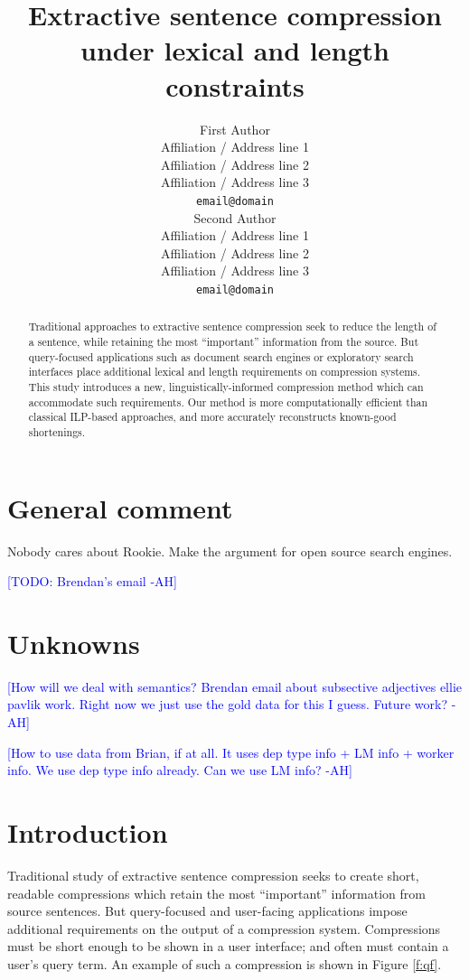 \documentclass[11pt,a4paper]{article}
\title{Extractive sentence compression under lexical and length constraints}
\author{First Author \\
  Affiliation / Address line 1 \\
  Affiliation / Address line 2 \\
  Affiliation / Address line 3 \\
  {\tt email@domain} \\\And
  Second Author \\
  Affiliation / Address line 1 \\
  Affiliation / Address line 2 \\
  Affiliation / Address line 3 \\
  {\tt email@domain} \\}
\date{}
\newcommand{\ahcomment}[1]{\textcolor{blue}{[#1 -AH]}}
\begin{document}
\maketitle

\begin{abstract}
Traditional approaches to extractive sentence compression seek to reduce the length of a sentence, while retaining the most ``important'' information from the source. But query-focused applications such as document search engines or exploratory search interfaces place additional lexical and length requirements on compression systems. This study introduces a new, linguistically-informed compression method which can accommodate such requirements.  Our method is more computationally efficient than classical ILP-based approaches, and more accurately reconstructs known-good shortenings.
\end{abstract}

\section{General comment}
Nobody cares about Rookie. Make the argument for open source search engines. 

\ahcomment{TODO: Brendan's email}

\section{Unknowns}

\ahcomment{How will we deal with semantics? Brendan email about subsective adjectives ellie pavlik work. Right now we just use the gold data for this I guess. Future work?}

\ahcomment{How to use data from Brian, if at all. It uses dep type info + LM info + worker info. We use dep type info already. Can we use LM info?}

\section{Introduction}

Traditional study of extractive sentence compression seeks to create short, readable compressions which retain the most ``important'' information from source sentences. But query-focused and user-facing applications impose additional requirements on the output of a compression system. Compressions must be short enough to be shown in a user interface; and often must contain a user's query term. An example of such a compression is shown in Figure \ref{f:qf}.
\end{document}
